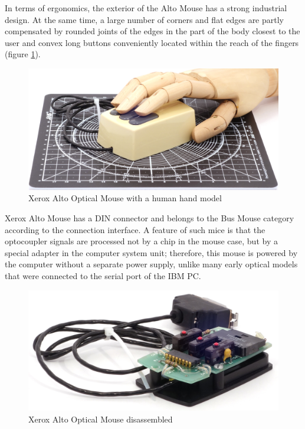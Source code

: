 \documentclass[11pt, a4paper]{article}
\begin{document}
In terms of ergonomics, the exterior of the Alto Mouse has a strong industrial design. At the same time, a large number of corners and flat edges are partly compensated by rounded joints of the edges in the part of the body closest to the user and convex long buttons conveniently located within the reach of the fingers (figure \ref{fig:NecAltoHand}).

\begin{figure}[h]
    \centering
    \includegraphics[scale=0.4]{1981_xerox_alto_mouse/hand_30.jpg}
    \caption{Xerox Alto Optical Mouse with a human hand model}
    \label{fig:NecAltoHand}
\end{figure}

Xerox Alto Mouse has a DIN connector and belongs to the Bus Mouse category according to the connection interface. A feature of such mice is that the optocoupler signals are processed not by a chip in the mouse case, but by a special adapter in the computer system unit; therefore, this mouse is powered by the computer without a separate power supply, unlike many early optical models that were connected to the serial port of the IBM PC.

\begin{figure}[h]
    \centering
    \includegraphics[scale=0.8]{1981_xerox_alto_mouse/inside_60.jpg}
    \caption{Xerox Alto Optical Mouse disassembled}
    \label{fig:NecAltoInside}
\end{figure}
\end{document}
